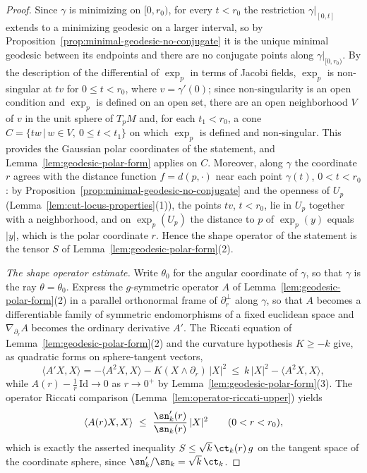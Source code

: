 \begin{proof}
Since $\gamma$ is minimizing on $[0,r_0)$, for every $t<r_0$ the
restriction $\gamma|_{[0,t]}$ extends to a minimizing geodesic on a
larger interval, so by
Proposition~\ref{prop:minimal-geodesic-no-conjugate} it is the
unique minimal geodesic between its endpoints and there are no
conjugate points along $\gamma|_{[0,r_0)}$. By the description of
the differential of $\exp_p$ in terms of Jacobi fields, $\exp_p$
is non-singular at $tv$ for $0\le t<r_0$, where $v=\gamma'(0)$;
since non-singularity is an open condition and $\exp_p$ is
defined on an open set, there are an open neighborhood $V$ of $v$
in the unit sphere of $T_pM$ and, for each $t_1<r_0$, a cone
$C=\{tw\,|\,w\in V,\ 0\le t<t_1\}$ on which $\exp_p$ is defined
and non-singular. This provides the Gaussian polar coordinates of
the statement, and Lemma~\ref{lem:geodesic-polar-form} applies on
$C$. Moreover, along $\gamma$ the coordinate $r$ agrees with the
distance function $f=d(p,\cdot)$ near each point $\gamma(t)$,
$0<t<r_0$: by Proposition~\ref{prop:minimal-geodesic-no-conjugate}
and the openness of $U_p$
(Lemma~\ref{lem:cut-locus-properties}(1)), the
points $tv$, $t<r_0$, lie in $U_p$ together with a neighborhood, and
on $\exp_p(U_p)$ the distance to $p$ of $\exp_p(y)$ equals
$|y|$, which is the polar coordinate $r$. Hence the shape operator
of the statement is the tensor $S$ of
Lemma~\ref{lem:geodesic-polar-form}(2).

\emph{The shape operator estimate.} Write $\theta_0$ for the
angular coordinate of $\gamma$, so that $\gamma$ is the ray
$\theta=\theta_0$. Express the $g$-symmetric operator $A$ of
Lemma~\ref{lem:geodesic-polar-form}(2) in a parallel orthonormal
frame of $\partial_r^\perp$ along $\gamma$, so that $A$ becomes a
differentiable family of symmetric endomorphisms of a fixed
euclidean space and $\nabla_{\partial_r}A$ becomes the ordinary
derivative $A'$. The Riccati equation of
Lemma~\ref{lem:geodesic-polar-form}(2) and the curvature
hypothesis $K\ge-k$ give, as quadratic forms on sphere-tangent
vectors,
$$\langle A'X,X\rangle=-\langle A^2X,X\rangle
-K(X\wedge\partial_r)\,|X|^2
\ \le\ k\,|X|^2-\langle A^2X,X\rangle,$$
while $A(r)-\tfrac1r\,\mathrm{Id}\to0$ as $r\to0^+$ by
Lemma~\ref{lem:geodesic-polar-form}(3). The operator Riccati
comparison (Lemma~\ref{lem:operator-riccati-upper}) yields
$$\langle A(r)X,X\rangle\ \le\
\frac{\sn_k'(r)}{\sn_k(r)}\,|X|^2\qquad(0<r<r_0),$$
which is exactly the asserted inequality $S\le\sqrt
k\,\ct_k(r)\,g$ on the tangent space of the coordinate sphere,
since $\sn_k'/\sn_k=\sqrt k\,\ct_k$.


\end{proof}
